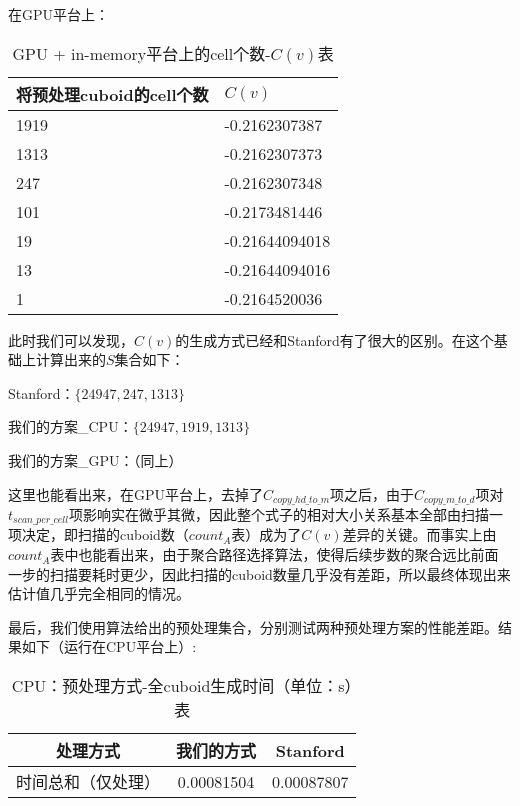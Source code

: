 在GPU平台上：

\begin{table}[!htbp]
\centering
\caption{GPU + in-memory平台上的cell个数-$C(v)$表} 
\label{tab:table17}
\begin{tabular}{|l|l|}
    \hline
    将预处理cuboid的cell个数 & $C(v)$\\
    \hline
    1919 & -0.2162307387\\
    \hline
    1313 & -0.2162307373\\
    \hline
    247 & -0.2162307348\\
    \hline
    101 & -0.2173481446\\
    \hline
    19 & -0.21644094018\\
    \hline
    13 & -0.21644094016\\
    \hline
    1 & -0.2164520036\\
    \hline
\end{tabular}
\end{table}

此时我们可以发现，$C(v)$的生成方式已经和Stanford有了很大的区别。在这个基础上计算出来的$S$集合如下：

Stanford：$\{24947, 247, 1313\}$

我们的方案\_CPU：$\{24947, 1919, 1313\}$

我们的方案\_GPU：（同上）

这里也能看出来，在GPU平台上，去掉了$C_{copy\_hd\_to\_m}$项之后，由于$C_{copy\_m\_to\_d}$项对$t_{scan\_per\_cell}$项影响实在微乎其微，因此整个式子的相对大小关系基本全部由扫描一项决定，即扫描的cuboid数（$count_A$表）成为了$C(v)$差异的关键。而事实上由$count_A$表中也能看出来，由于聚合路径选择算法，使得后续步数的聚合远比前面一步的扫描要耗时更少，因此扫描的cuboid数量几乎没有差距，所以最终体现出来估计值几乎完全相同的情况。

最后，我们使用算法给出的预处理集合，分别测试两种预处理方案的性能差距。结果如下（运行在CPU平台上）:

\begin{table}[!htbp]
\centering
\caption{CPU：预处理方式-全cuboid生成时间（单位：s）表} 
\label{tab:table18}
\begin{tabular}{|c|c|c|}
    \hline
    处理方式 & 我们的方式 & Stanford\\
    \hline
    时间总和（仅处理） & 0.00081504 & 0.00087807\\
    \hline
\end{tabular}
\end{table}


